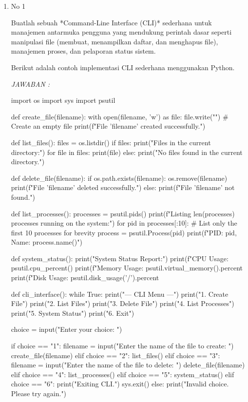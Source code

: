 \documentclass[12pt]{article}
\begin{document}
\begin{enumerate}


    \item No 1

    
    Buatlah sebuah *Command-Line Interface (CLI)* sederhana untuk manajemen antarmuka pengguna yang mendukung perintah dasar seperti manipulasi file (membuat, menampilkan daftar, dan menghapus file), manajemen proses, dan pelaporan status sistem.

Berikut adalah contoh implementasi CLI sederhana menggunakan Python.

\textit{JAWABAN : }
\begin{python}
import os
import sys
import psutil

def create_file(filename):
    with open(filename, 'w') as file:
        file.write("")  # Create an empty file
    print(f"File '{filename}' created successfully.")

def list_files():
    files = os.listdir()
    if files:
        print("Files in the current directory:")
        for file in files:
            print(file)
    else:
        print("No files found in the current directory.")

def delete_file(filename):
    if os.path.exists(filename):
        os.remove(filename)
        print(f"File '{filename}' deleted successfully.")
    else:
        print(f"File '{filename}' not found.")

def list_processes():
    processes = psutil.pids()
    print(f"Listing {len(processes)} processes running on the system:")
    for pid in processes[:10]:  # List only the first 10 processes for brevity
        process = psutil.Process(pid)
        print(f"PID: {pid}, Name: {process.name()}")

def system_status():
    print("System Status Report:")
    print(f"CPU Usage: {psutil.cpu_percent()}%
    print(f"Memory Usage: {psutil.virtual_memory().percent}%
    print(f"Disk Usage: {psutil.disk_usage('/').percent}%

def cli_interface():
    while True:
        print("\n--- CLI Menu ---")
        print("1. Create File")
        print("2. List Files")
        print("3. Delete File")
        print("4. List Processes")
        print("5. System Status")
        print("6. Exit")

        choice = input("Enter your choice: ")

        if choice == "1":
            filename = input("Enter the name of the file to create: ")
            create_file(filename)
        elif choice == "2":
            list_files()
        elif choice == "3":
            filename = input("Enter the name of the file to delete: ")
            delete_file(filename)
        elif choice == "4":
            list_processes()
        elif choice == "5":
            system_status()
        elif choice == "6":
            print("Exiting CLI.")
            sys.exit()
        else:
            print("Invalid choice. Please try again.")


\end{python}
\end{enumerate}
\end{document}
